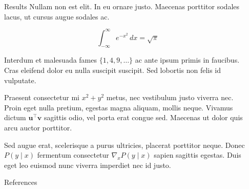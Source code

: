 \documentclass[final, 20pt]{beamer}
\newlength{\sepwidth}
\newlength{\colwidth}
\newcommand{\separatorcolumn}{\begin{column}{\sepwidth}\end{column}}
\begin{document}
\begin{frame}[t]
\begin{columns}[t]
\begin{column}{\colwidth}
\begin{alertblock}{Results}
    Nullam non est elit. In eu ornare justo. Maecenas porttitor sodales lacus,
    ut cursus augue sodales ac.

    $$
    \int_{-\infty}^{\infty} e^{-x^2}\,dx = \sqrt{\pi}
    $$

    Interdum et malesuada fames $\{1, 4, 9, \ldots\}$ ac ante ipsum primis in
    faucibus. Cras eleifend dolor eu nulla suscipit suscipit. Sed lobortis non
    felis id vulputate.


    Praesent consectetur mi $x^2 + y^2$ metus, nec vestibulum justo viverra
    nec. Proin eget nulla pretium, egestas magna aliquam, mollis neque. Vivamus
    dictum $\mathbf{u}^\intercal\mathbf{v}$ sagittis odio, vel porta erat
    congue sed. Maecenas ut dolor quis arcu auctor porttitor.


    Sed augue erat, scelerisque a purus ultricies, placerat porttitor neque.
    Donec $P(y \mid x)$ fermentum consectetur $\nabla_x P(y \mid x)$ sapien
    sagittis egestas. Duis eget leo euismod nunc viverra imperdiet nec id
    justo.

    \lipsum[50-51]

  \end{alertblock}

%
%
%

  \begin{block}{References}

    \nocite{*}
    \footnotesize{}

  \end{block}

\end{column}

\separatorcolumn
\end{columns}
\end{frame}
\end{document}
